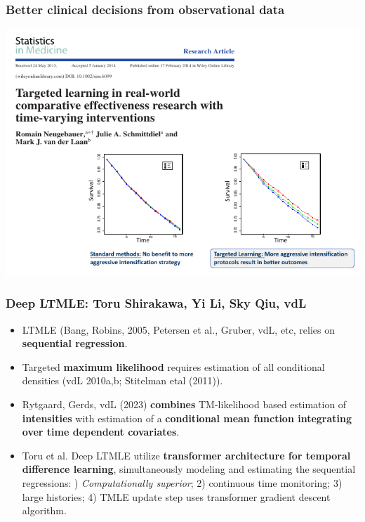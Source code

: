 \documentclass[t]{beamer}
\begin{document}
\begin{frame}
\frametitle{Better clinical decisions from observational data}
\vspace{-20pt}
\begin{center}
  \includegraphics[width = 1.02\textwidth]{figures/diabetes.pdf}
  \end{center}
\end{frame}

\begin{frame}\frametitle{Deep LTMLE: Toru Shirakawa, Yi Li, Sky Qiu, vdL}
\begin{itemize}
\item LTMLE (Bang, Robins, 2005, Petersen et al., Gruber, vdL, etc, relies on {\bf sequential regression}.
\item Targeted {\bf maximum likelihood} requires estimation of all conditional densities (vdL 2010a,b; Stitelman etal (2011)).
\item Rytgaard, Gerds, vdL (2023) {\bf combines}  TM-likelihood based estimation of {\bf intensities}  with estimation of a {\bf conditional mean function integrating over time dependent covariates}.
\item Toru et al. Deep LTMLE utilize {\bf transformer architecture for temporal difference learning}, simultaneously modeling and estimating the sequential regressions: )  {\em Computationally superior}; 2) continuous time monitoring; 3)  large histories; 4)  TMLE update step uses transformer gradient descent algorithm. 
\end{itemize}
\end{frame} 
\end{document}
